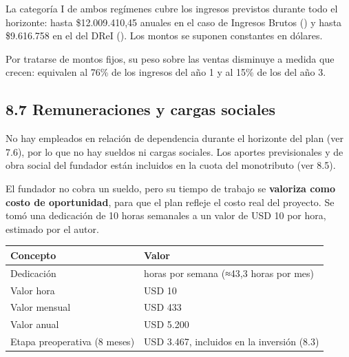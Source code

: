 La categoría I de ambos regímenes cubre los ingresos previstos durante
todo el horizonte: hasta \$12.009.410,45 anuales en el caso de Ingresos
Brutos ()
y hasta \$9.616.758 en el del DReI
(). Los
montos se suponen constantes en dólares.

Por tratarse de montos fijos, su peso sobre las ventas disminuye a
medida que crecen: equivalen al 76\% de los ingresos del año 1 y al 15\%
de los del año 3.

\subsection*{8.7 Remuneraciones y cargas
sociales}\label{remuneraciones-y-cargas-sociales}

No hay empleados en relación de dependencia durante el horizonte del
plan (ver 7.6), por lo que no hay sueldos ni cargas sociales. Los
aportes previsionales y de obra social del fundador están incluidos en
la cuota del monotributo (ver 8.5).

El fundador no cobra un sueldo, pero su tiempo de trabajo se
\textbf{valoriza como costo de oportunidad}, para que el plan refleje el
costo real del proyecto. Se tomó una dedicación de 10 horas semanales a
un valor de USD 10 por hora, estimado por el autor.

{\def\LTcaptype{none} %
\begin{longtable}[]{@{}
  >{\raggedright\arraybackslash}p{}
  >{\raggedright\arraybackslash}p{}@{}}
\toprule\noalign{}
\begin{minipage}[b]{\linewidth}\raggedright
Concepto
\end{minipage} & \begin{minipage}[b]{\linewidth}\raggedright
Valor
\end{minipage} \\
\midrule\noalign{}
\endhead
\bottomrule\noalign{}
\endlastfoot
Dedicación & 10 horas por semana (≈43,3 horas por mes) \\
Valor hora & USD 10 \\
Valor mensual & USD 433 \\
Valor anual & USD 5.200 \\
Etapa preoperativa (8 meses) & USD 3.467, incluidos en la inversión
(8.3) \\
\end{longtable}
}

